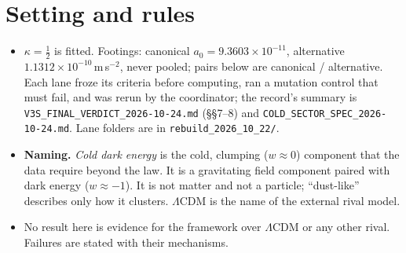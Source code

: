 \documentclass[10pt]{article}
\begin{document}
\begin{abstract}
\begin{enumerate}
\item \textbf{Deriving $c_f$.} Scale-free infall gives 1.85 and fails; spherical collapse of the initial peak profile also gives 1.85 and fails (post hoc, exploratory). Collisionless zoom simulations in the record give a native $c_f$ of 7.2 / 7.0 / 5.6 at $10^{12}$ / $10^{13}$ / $10^{14}\,M_\odot$, above the data's window and not converged (uncertain by about a factor 2). With that native $c_f$ the rule passes SPARC, groups and every cluster key but one, the 326-cluster inner band, which it over-predicts ($Z=-2.41$). This is the closest result in the record with no borrowed number; more seeds are running.
\item \textbf{Dwarfs.} The same $a_0$-floor halos, with nothing new fitted, reproduce four of five Local Group dwarf classes and fail the Milky Way ultra-faints ($Z=+3.80$ / $+3.66$, under-predicted).
\item \textbf{The tether.} A local vacuum-set floor ($g_T=0.254\,a_0$) fails growth and self-consistency. A floor keyed on bound objects is consistent but nonlocal, and has no action.
\item \textbf{Current picture.} $a_0$ sets the cold dark energy core floor from dwarfs to large spirals; above galaxy scale, collapse plus a native concentration sets the core. Three items are open: the cluster inner band with the convergence of $c_f$, the ultra-faint halo masses, and the tether mechanism.
\item \textbf{A map, for orientation only.} A Cosmicflows-4 flow map with the SPARC galaxies and nearby eRASS1 clusters on it illustrates the picture. It is not evidence for the theory.
\end{enumerate}
\end{abstract}

\section{Setting and rules}
\begin{itemize}
\item $\kappa=\tfrac12$ is fitted. Footings: canonical $a_0=9.3603\times10^{-11}$, alternative $1.1312\times10^{-10}$\,m\,s$^{-2}$, never pooled; pairs below are canonical / alternative. Each lane froze its criteria before computing, ran a mutation control that must fail, and was rerun by the coordinator; the record's summary is \texttt{V3S\_FINAL\_VERDICT\_2026-10-24.md} (\S\S7--8) and \texttt{COLD\_SECTOR\_SPEC\_2026-10-24.md}. Lane folders are in \texttt{rebuild\_2026\_10\_22/}.
\item \textbf{Naming.} \emph{Cold dark energy} is the cold, clumping ($w\approx0$) component that the data require beyond the law. It is a gravitating field component paired with dark energy ($w\approx-1$). It is not matter and not a particle; ``dust-like'' describes only how it clusters. $\Lambda$CDM is the name of the external rival model.
\item No result here is evidence for the framework over $\Lambda$CDM or any other rival. Failures are stated with their mechanisms.
\end{itemize}
\end{document}
